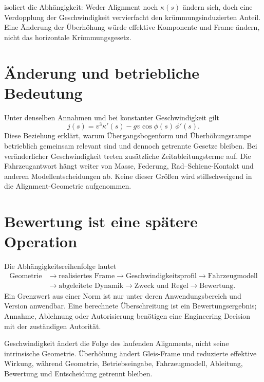  isoliert die Abhängigkeit: Weder Alignment
noch \(\kappa(s)\) ändern sich, doch eine Verdopplung der Geschwindigkeit
vervierfacht den krümmungsinduzierten Anteil. Eine Änderung der Überhöhung
würde effektive Komponente und Frame ändern, nicht das horizontale
Krümmungsgesetz.

\section{Änderung und betriebliche Bedeutung}

Unter denselben Annahmen und bei konstanter Geschwindigkeit gilt
\[
j(s)=v^3\kappa'(s)-gv\cos\phi(s)\,\phi'(s).
\]
Diese Beziehung erklärt, warum Übergangsbogenform und Überhöhungsrampe
betrieblich gemeinsam relevant sind und dennoch getrennte Gesetze bleiben.
Bei veränderlicher Geschwindigkeit treten zusätzliche Zeitableitungsterme auf.
Die Fahrzeugantwort hängt weiter von Masse, Federung, Rad--Schiene-Kontakt und
anderen Modellentscheidungen ab. Keine dieser Größen wird stillschweigend in
die Alignment-Geometrie aufgenommen.

\section{Bewertung ist eine spätere Operation}

Die Abhängigkeitsreihenfolge lautet
\begin{align*}
\text{Geometrie}&\rightarrow\text{realisiertes Frame}
\rightarrow\text{Geschwindigkeitsprofil}\rightarrow\text{Fahrzeugmodell}\\
&\rightarrow\text{abgeleitete Dynamik}
\rightarrow\text{Zweck und Regel}\rightarrow\text{Bewertung}.
\end{align*}
Ein Grenzwert aus einer Norm ist nur unter deren Anwendungsbereich und Version
anwendbar. Eine berechnete Überschreitung ist ein Bewertungsergebnis; Annahme,
Ablehnung oder Autorisierung benötigen eine Engineering Decision mit der
zuständigen Autorität.

\begin{summary}
Geschwindigkeit ändert die Folge des laufenden Alignments, nicht seine
intrinsische Geometrie. Überhöhung ändert Gleis-Frame und reduzierte effektive
Wirkung, während Geometrie, Betriebseingabe, Fahrzeugmodell, Ableitung,
Bewertung und Entscheidung getrennt bleiben.
\end{summary}
